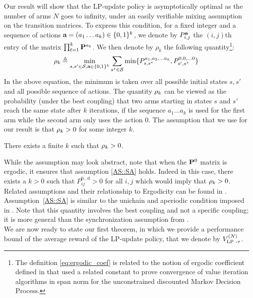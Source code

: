 Our result will show that the LP-update policy is asymptotically optimal as the number of arms $N$ goes to infinity, under an easily verifiable mixing assumption on the transition matrices. To express this condition, for a fixed integer and a sequence of actions $\textbf{a}=(a_1\dots a_k)\in\{0,1\}^k$, we denote by $P^{\textbf{a}}_{i, j}$ the $(i,j)$th entry of the matrix $\prod_{t=1}^k \mathbf{P}^{a_k}$. We then denote by $\rho_k$ the following quantity\footnote{The definition \eqref{eq:ergodic_coef} is related to the notion of ergodic coefficient defined in \citep{puterman2014markov} that used a related constant to prove convergence of value iteration algorithms in span norm for the unconstrained discounted Markov Decision Process.}: 
\begin{align}
    \label{eq:ergodic_coef}
      \rho_{k} \triangleq \min_{s, s'\in\mathcal{S}, \textbf{a}\in\{0,1\}^k} \sum_{s^* \in \mathcal{S}}\min\{P^{a_1, a_2, \dots a_k}_{s, s^*}, P^{0, 0, \dots 0}_{s', s^*}\}    
\end{align}
In the above equation, the minimum is taken over all possible initial states $s,s'$ and all possible sequence of actions. The quantity $\rho_k$ can be viewed as the probability (under the best coupling) that two arms starting in states $s$ and $s'$ reach the same state after $k$ iterations, if the sequence $a_1\dots a_k$ is used for the first arm while the second arm only uses the action $0$.  The assumption that we use for our result is that $\rho_k>0$ for some integer $k$.
\begin{assumption}\label{AS::SA}
    There exists a finite $k$ such that $\rho_{k} > 0$.
\end{assumption}
While the assumption may look abstract, note that when the $\mathbf{P}^{0}$ matrix is ergodic, it ensures that assumption \ref{AS::SA} holds. Indeed in this case, there exists a $k>0$ such that $P^{0\dots 0}_{ij}>0$ for all $i,j$ which would imply that $\rho_{k} > 0$.  Related assumptions and their relationship to Ergodicity can be found in \citet{hernandez2012discrete}.  Assumption~\ref{AS::SA} is similar to the unichain and aperiodic condition imposed in \citet{hong2024unichain}.  Note that this quantity involves the best coupling and not a specific coupling; it is more general than the synchronization assumption from \citet{HXCW23}. \\
We are now ready to state our first theorem, in which we provide a performance bound of the average reward of the LP-update policy, that we denote by $V_{\text{LP -}\tau}^{(N)}$.

